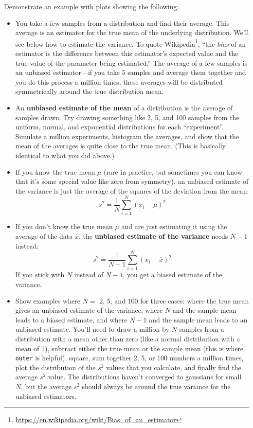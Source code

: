 \documentclass[11pt]{hmcpset}
\begin{document}
\begin{solution}
	
	\vfill
	
\end{solution}
	\pagebreak
\begin{problem}

Demonstrate an example with plots showing the following:
	\begin{itemize}
		\item You take a few samples from a distribution and find their average. This average is an estimator for the true mean of the underlying distribution. We'll see below how to estimate the variance. To quote Wikipedia\footnote{\url{https://en.wikipedia.org/wiki/Bias_of_an_estimator}}, ``the \textit{bias} of an estimator is the difference between this estimator's expected value and the true value of the parameter being estimated.'' The average of a few samples is an unbiased estimator---if you take 5 samples and average them together and you do this process a million times, these averages will be distributed symmetrically around the true distribution mean. 
		\item An \textbf{unbiased estimate of the mean} of a distribution is the average of samples drawn. Try drawing something like 2, 5, and 100 samples from the uniform, normal, and exponential distributions for each ``experiment''. Simulate a million experiments, histogram the averages, and show that the mean of the averages is quite close to the true mean. (This is basically identical to what you did above.)
		\item If you know the true mean $\mu$ (rare in practice, but sometimes you can know that it's some special value like zero from symmetry), an unbiased estimate of the variance is just the average of the squares of the deviation from the mean:
		\[
		s^2 = \frac{1}{N} \sum_{i=1}^N (x_i - \mu)^2
		\]
		\item If you don't know the true mean $\mu$ and are just estimating it using the average of the data $\overline{x}$, the \textbf{unbiased estimate of the variance} needs $N-1$ instead:
		\[
		s^2 = \frac{1}{N-1} \sum_{i=1}^N (x_i - \overline{x})^2
		\]
		If you stick with $N$ instead of $N-1$, you get a biased estimate of the variance.
		\item Show examples where $N=$ 2, 5, and 100 for three cases: where the true mean gives an unbiased estimate of the variance, where $N$ and the sample mean leads to a biased estimate, and where $N-1$ and the sample mean leads to an unbiased estimate. You'll need to draw a million-by-$N$ samples from a distribution with a mean other than zero (like a normal distribution with a mean of 1), subtract either the true mean or the sample mean (this is where \texttt{outer} is helpful), square, sum together 2, 5, or 100 numbers a million times, plot the distribution of the $s^2$ values that you calculate, and finally find the average $s^2$ value. The distributions haven't converged to gaussians for small $N$, but the average $s^2$ should always be around the true variance for the unbiased estimators.

\end{itemize}
\end{problem}
\end{document}
